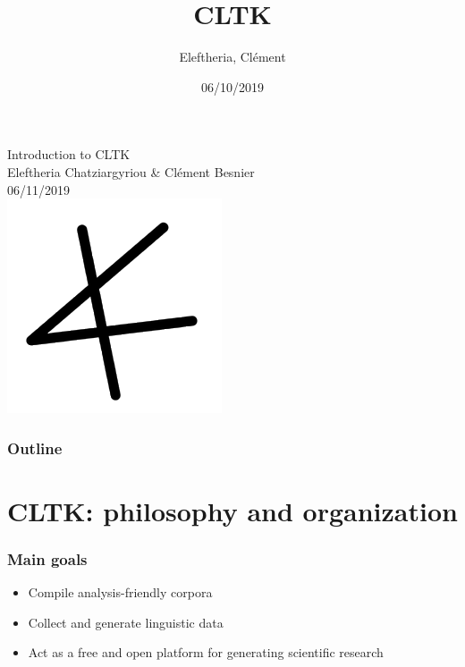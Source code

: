 \documentclass{beamer}
\title{CLTK}
\author{Eleftheria, Clément}
\institute{CLTK}
\date{06/10/2019}
\begin{document}
\begin{frame}
\begin{center}
    {\large Introduction to CLTK}\\
    Eleftheria Chatziargyriou \& Clément Besnier \\
    06/11/2019 \\
    \includegraphics[scale=0.5]{cltklogo.png}
\end{center}

\end{frame}

\begin{frame}
\frametitle{Outline}
\tableofcontents
\end{frame}

\section{CLTK: philosophy and organization}


\begin{frame}
\frametitle{Main goals}
\begin{itemize}
\item Compile analysis-friendly corpora
\item Collect and generate linguistic data
\item Act as a free and open platform for generating scientific research
\end{itemize}
    
\end{frame}
\end{document}
